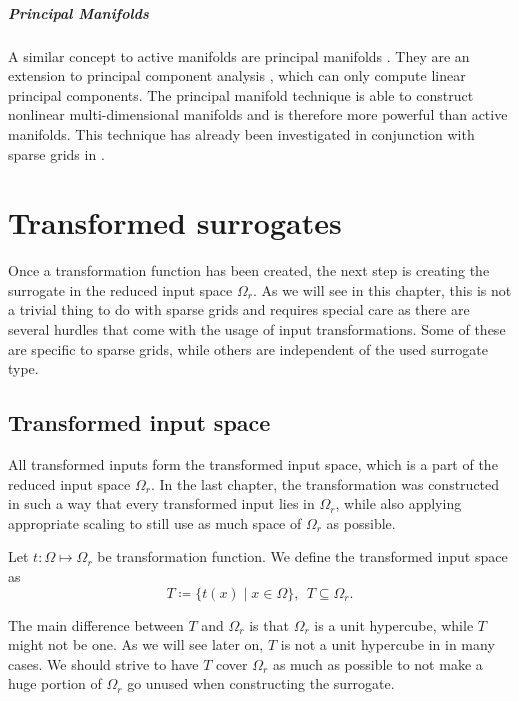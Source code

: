 \documentclass[
  a4paper,  %
  twoside,  %
  bibliography=totoc,
  headsepline,
  cleardoublepage=empty,
  parskip=half,
  draft=false
]{scrbook}
\begin{document}
\paragraph{Principal Manifolds}
A similar concept to active manifolds are principal manifolds \cite{Huo2008}.
They are an extension to principal component analysis \cite{Abdi2010}, which can only compute linear principal components.
The principal manifold technique is able to construct nonlinear multi-dimensional manifolds and is therefore more powerful than active manifolds.
This technique has already been investigated in conjunction with sparse grids in \cite{Feuersaenger2009}.

\chapter{Transformed surrogates}
\label{chap:c4}

Once a transformation function has been created, the next step is creating the surrogate in the reduced input space $\Omega_r$.
As we will see in this chapter, this is not a trivial thing to do with sparse grids and requires special care as there are several hurdles that come with the usage of input transformations.
Some of these are specific to sparse grids, while others are independent of the used surrogate type.

\section{Transformed input space}
\label{sec:tis}

All transformed inputs form the transformed input space, which is a part of the reduced input space $\Omega_r$.
In the last chapter, the transformation was constructed in such a way that every transformed input lies in $\Omega_r$, while also applying appropriate scaling to still use as much space of $\Omega_r$ as possible.

\begin{definition}
Let $t \colon \Omega \mapsto \Omega_r$ be transformation function.
We define the transformed input space as
\begin{equation}
T \coloneqq \{t(x) \mid x \in\Omega\}, ~~ T \subseteq \Omega_r.
\end{equation}
\end{definition}
%
The main difference between $T$ and $\Omega_r$ is that $\Omega_r$ is a unit hypercube, while $T$ might not be one.
As we will see later on, $T$ is not a unit hypercube in in many cases.
We should strive to have $T$ cover $\Omega_r$ as much as possible to not make a huge portion of $\Omega_r$ go unused when constructing the surrogate.
\end{document}
